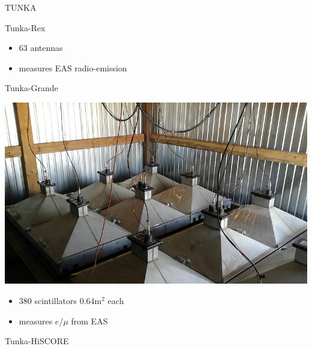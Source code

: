\begin{frame}{TUNKA}
\begin{minipage}[t]{0.48\textwidth}
\begin{block}{Tunka-Rex}
{    }
    \parbox{0.55\textwidth}{
        \begin{itemize}
            \setlength{\itemsep}{0pt}
            \item 63 antennas
            \item measures EAS radio-emission
            \vspace{1em}
        \end{itemize}
    }
  \end{block}
\end{minipage}

\vspace{-1ex}
\begin{minipage}[t]{0.48\textwidth}
  \begin{block}{Tunka-Grande}
    \parbox{0.45\textwidth}{
    \centering
    \includegraphics[height=0.23\textheight]{pics/Hiller_Roman-005.jpg}
        }
    \parbox{0.5\textwidth}{
    \begin{itemize}
      \setlength{\itemsep}{0pt}
      \item 380 scintillators 0.64m$^2$ each
      \item measures $e$/$\mu$ from EAS
    \end{itemize}
}
  \end{block}
\end{minipage}
\hfill
\begin{minipage}[t]{0.48\textwidth}
  \begin{block}{Tunka-HiSCORE}

\end{block}
\end{minipage}
\end{frame}

